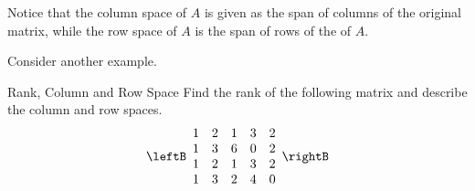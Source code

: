 Notice that the column space of $A$ is given as the span of columns of the original matrix, while the row space of $A$ is the span of rows of the \rref \; of $A$. 

Consider another example.

\begin{example}{Rank, Column and Row Space}\label{exa:rankcolumnrowspace2}
Find the rank of the following matrix and describe the
column and row spaces.
\begin{equation*}
\leftB
\begin{array}{rrrrrr}
1 & 2 & 1 & 3 & 2 \\
1 & 3 & 6 & 0 & 2 \\
1 & 2 & 1 & 3 & 2 \\
1 & 3 & 2 & 4 & 0
\end{array}
\rightB
\end{equation*}
\end{example}

